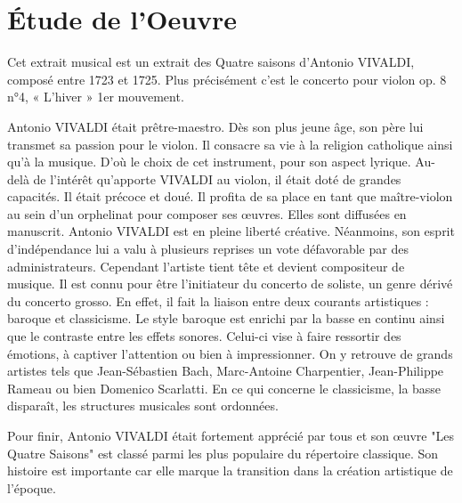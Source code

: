 \documentclass[12pt]{article}
\begin{document}




\section{Étude de l'Oeuvre}

Cet extrait musical est un extrait des Quatre saisons d’Antonio VIVALDI, composé entre 1723 et 1725. 
Plus précisément c’est le concerto pour violon op. 8 n°4, « L’hiver » 1er mouvement. 

Antonio VIVALDI était prêtre-maestro. Dès son plus jeune âge, son père lui transmet sa passion pour le violon. 
Il consacre sa vie à la religion catholique ainsi qu’à la musique. D’où le choix de cet instrument, 
pour son aspect lyrique. Au-delà de l'intérêt qu'apporte VIVALDI au violon, il était doté de grandes capacités. 
Il était précoce et doué. Il profita de sa place en tant que maître-violon au sein d’un orphelinat pour composer ses œuvres.
Elles sont diffusées en manuscrit. Antonio VIVALDI est en pleine liberté créative. 
Néanmoins, son esprit d’indépendance lui a valu à plusieurs reprises un vote défavorable par des administrateurs. 
Cependant l’artiste tient tête et devient compositeur de musique. Il est connu pour être l’initiateur du concerto de soliste, 
un genre dérivé du concerto grosso. En effet, il fait la liaison entre deux courants artistiques : baroque et classicisme. 
Le style baroque est enrichi par la basse en continu ainsi que le contraste entre les effets sonores. 
Celui-ci vise à faire ressortir des émotions, à captiver l’attention ou bien à impressionner. 
On y retrouve de grands artistes tels que Jean-Sébastien Bach, Marc-Antoine Charpentier, Jean-Philippe Rameau ou 
bien Domenico Scarlatti. En ce qui concerne le classicisme, la basse disparaît, les structures musicales sont ordonnées. 

Pour finir, Antonio VIVALDI était fortement apprécié par tous et son œuvre "Les Quatre Saisons" est classé parmi les 
plus populaire du répertoire classique. Son histoire est importante car elle marque la transition dans la création artistique de l’époque.
\end{document}
